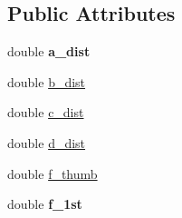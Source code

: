 \subsection*{Public Attributes}
\begin{DoxyCompactItemize}
\item 
\hypertarget{classFullhand__dist_a893c6b9ab7ce619867b2537bddd48907}{
double {\bfseries a\_\-dist}}
\label{classFullhand__dist_a893c6b9ab7ce619867b2537bddd48907}

\item 
double \hyperlink{classFullhand__dist_a84a320c58fe2712d7956b4e165deea85}{b\_\-dist}
\item 
double \hyperlink{classFullhand__dist_ac3b2b97d964c72201b1bf8b3b207e90c}{c\_\-dist}
\item 
double \hyperlink{classFullhand__dist_a90f722fb8e112d160589a601e3c4ba1b}{d\_\-dist}
\item 
double \hyperlink{classFullhand__dist_af5a94f725ddf9eed54e22f6ba8262d0c}{f\_\-thumb}
\item 
\hypertarget{classFullhand__dist_a652f7a1f957b103a646baf29828e5ecd}{
double {\bfseries f\_\-1st}}
\label{classFullhand__dist_a652f7a1f957b103a646baf29828e5ecd}


\end{DoxyCompactItemize}
